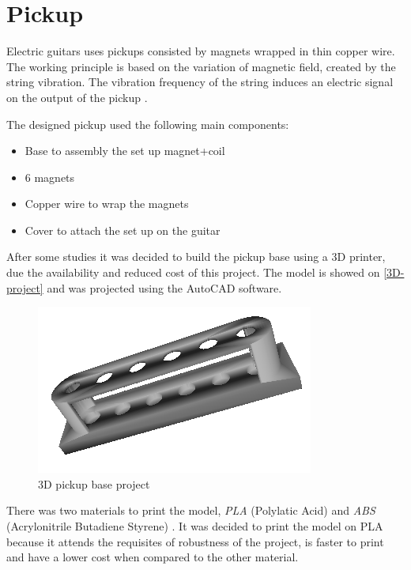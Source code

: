 \section{Pickup}
\label{pickup-project}

Electric guitars uses pickups consisted by magnets wrapped in thin  copper wire. The
working principle is based on the variation of magnetic field, created by the string
vibration. The vibration frequency of the string induces an electric signal on the output of the pickup \cite{pickup-work}
\cite{faraday-law}.

The designed pickup used the following main components:

{\begin{itemize}
  \item Base to assembly the set up magnet+coil
  \item 6 magnets
  \item Copper wire to wrap the magnets
  \item Cover to attach the set up on the guitar
\end{itemize}}

After some studies it was decided to build the pickup base using a 3D printer, due the
availability and reduced cost of this project. The model is showed on \autoref{3D-project}
and was projected using the AutoCAD software.

\begin{figure}[!htpb]
\centering
\caption{3D pickup base project}
\label{3D-project}
\includegraphics[scale=0.5]{images/pickup}
\end{figure}

There was two materials to print the model, \textit{PLA} (Polylatic Acid) \cite{3d-materials}
and \textit{ABS} (Acrylonitrile Butadiene Styrene) \cite{3d-materials}. It was decided to print
the model on PLA because it attends the requisites of robustness of the project, is
faster to print and have a lower cost when compared to the other material.

